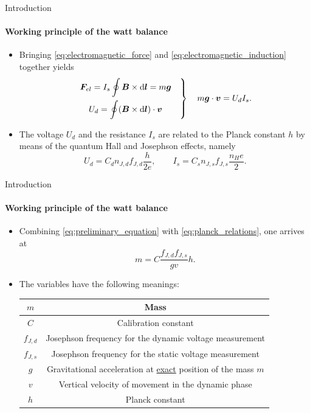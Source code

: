 \documentclass{beamer}
\begin{document}
\begin{frame}[allowframebreaks]{Introduction}
\framesubtitle{Working principle of the watt balance}
\begin{itemize}
    \item Bringing \cref{eq:electromagnetic_force} and \cref{eq:electromagnetic_induction} together yields
    \begin{equation}\label{eq:preliminary_equation}
    \left.
    \begin{aligned}
    \bm{F}_{el} = I_s\oint\bm{B}&\times \mathrm{d}\bm{l} = m\bm{g}  \\
    U_d = \oint (\bm{B}&\times \mathrm{d}\bm{l})\cdot \bm{v}
    \end{aligned}  \quad \right\} \quad  m\bm{g}\cdot\bm{v} = U_dI_s.
\end{equation}
\item The voltage $U_d$ and the resistance $I_s$ are related to the Planck constant $h$ by means of the quantum Hall and Josephson effects, namely \begin{equation}\label{eq:planck_relations}
    U_d = C_dn_{J,d}f_{J,d}\frac{h}{2e}, \qquad I_s = C_sn_{J,s}f_{J,s}\frac{n_He}{2}.
\end{equation}
\end{itemize}
\end{frame}

\begin{frame}[allowframebreaks]{Introduction}
\framesubtitle{Working principle of the watt balance}
\begin{itemize}
    \item Combining \cref{eq:preliminary_equation} with \cref{eq:planck_relations}, one arrives at
    \begin{equation}
        m = C\frac{f_{J,d} f_{J,s}}{gv}h.
    \end{equation}
    \item The variables have the following meanings:
    \begin{table}
        \centering
    \footnotesize
    \begin{tabular}{|c|c|}
    \hline
    $m$ & Mass \\
    \hline
    $C$ & Calibration constant \\
    \hline
    $f_{J,d}$ & Josephson frequency for the dynamic voltage measurement \\
    \hline
    $f_{J,s}$ & Josephson frequency for the static voltage measurement \\
    \hline
    $g$ & Gravitational acceleration at \underline{exact} position of the mass $m$ \\
    \hline
    $v$ & Vertical velocity of movement in the dynamic phase \\
    \hline
    $h$ & Planck constant \\
    \hline
    \end{tabular}
    \end{table}
\end{itemize}
\end{frame}
\end{document}
